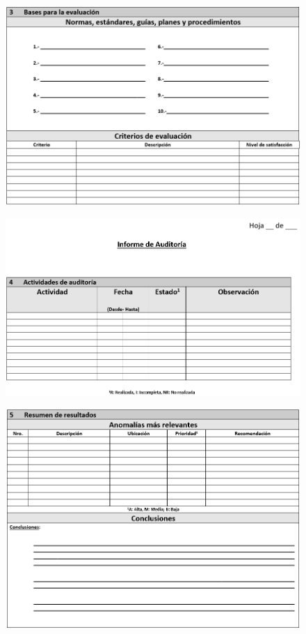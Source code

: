 \begin{figure}[H]
\centering
\includegraphics[width=1\textwidth]{figures/anexos/2-3.PNG}
\end{figure}

\begin{figure}[H]
\centering
\includegraphics[width=1\textwidth]{figures/anexos/2-4.PNG}
\end{figure}

\begin{figure}[H]
\centering
\includegraphics[width=1\textwidth]{figures/anexos/2-5a.PNG}
\end{figure}


